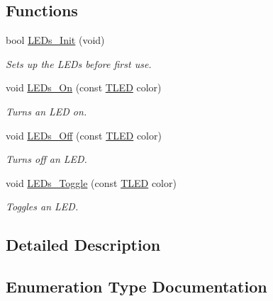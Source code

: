 \subsection*{Functions}
\begin{DoxyCompactItemize}
\item 
bool \hyperlink{group___l_e_ds__module_gaea5d2a9d1aacacc05e4d772a555b2d9d}{L\+E\+Ds\+\_\+\+Init} (void)
\begin{DoxyCompactList}\small\item\em Sets up the L\+E\+Ds before first use. \end{DoxyCompactList}\item 
void \hyperlink{group___l_e_ds__module_ga1e5974ccd48f4e74eb3be78a51ebf16f}{L\+E\+Ds\+\_\+\+On} (const \hyperlink{group___l_e_ds__module_ga833ecccaa4c55e8365e84d6c02f92ec1}{T\+L\+E\+D} color)
\begin{DoxyCompactList}\small\item\em Turns an L\+E\+D on. \end{DoxyCompactList}\item 
void \hyperlink{group___l_e_ds__module_gaefecb26a8d3457bc7f7a7b2fb8b7311f}{L\+E\+Ds\+\_\+\+Off} (const \hyperlink{group___l_e_ds__module_ga833ecccaa4c55e8365e84d6c02f92ec1}{T\+L\+E\+D} color)
\begin{DoxyCompactList}\small\item\em Turns off an L\+E\+D. \end{DoxyCompactList}\item 
void \hyperlink{group___l_e_ds__module_ga00b9c778cd7168ea0df402b263a609bb}{L\+E\+Ds\+\_\+\+Toggle} (const \hyperlink{group___l_e_ds__module_ga833ecccaa4c55e8365e84d6c02f92ec1}{T\+L\+E\+D} color)
\begin{DoxyCompactList}\small\item\em Toggles an L\+E\+D. \end{DoxyCompactList}\end{DoxyCompactItemize}


\subsection{Detailed Description}


\subsection{Enumeration Type Documentation}
\hypertarget{group___l_e_ds__module_ga833ecccaa4c55e8365e84d6c02f92ec1}{}
